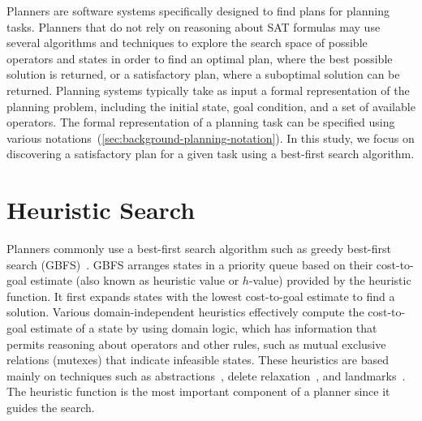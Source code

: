 \documentclass[ppgc,diss,english]{iiufrgs}
\begin{document}
Planners are software systems specifically designed to find plans for planning tasks. Planners that do not rely on reasoning about SAT formulas may use several algorithms and techniques to explore the search space of possible operators and states in order to find an optimal plan, where the best possible solution is returned, or a satisfactory plan, where a suboptimal solution can be returned. Planning systems typically take as input a formal representation of the planning problem, including the initial state, goal condition, and a set of available operators. The formal representation of a planning task can be specified using various notations~(\cref{sec:background-planning-notation}).
In this study, we focus on discovering a satisfactory plan for a given task using a best-first search algorithm.%


\section{Heuristic Search}
\label{sec:intro-heuristic-search}
Planners commonly use a best-first search algorithm such as greedy best-first search (GBFS)~\cite{Doran.Michie/1966}. GBFS arranges states in a priority queue based on their cost-to-goal estimate (also known as heuristic value or $h$-value) provided by the heuristic function. It first expands states with the lowest cost-to-goal estimate to find a solution. Various domain-independent heuristics effectively compute the cost-to-goal estimate of a state by using domain logic, which has information that permits reasoning about operators and other rules, such as mutual exclusive relations (mutexes) that indicate infeasible states. These heuristics are based mainly on techniques such as abstractions~\cite{Culberson.Schaeffer/1998}, delete relaxation~\cite{Hoffmann.Nebel/2001}, and landmarks~\cite{Hoffmann.etal/2004,Helmert.Domshlak/2009}. The heuristic function is the most important component of a planner since it guides the search.
\end{document}
